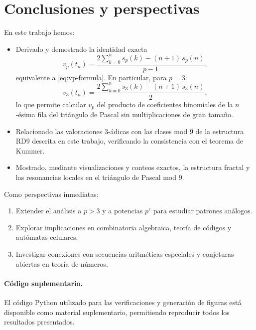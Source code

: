 \documentclass[12pt]{article}
\begin{document}
\section*{Conclusiones y perspectivas}

En este trabajo hemos:
\begin{itemize}
  \item Derivado y demostrado la identidad exacta
  \[
    v_p(t_n) = \frac{2\sum_{k=0}^{n} s_p(k) - (n+1)\, s_p(n)}{p-1},
  \]
  equivalente a \eqref{eq:vp-formula}. En particular, para $p=3$:
  \[
    v_3(t_n) = \frac{2\sum_{k=0}^{n} s_3(k) - (n+1)\, s_3(n)}{2},
  \]
  lo que permite calcular $v_p$ del producto de coeficientes binomiales de la $n$-ésima fila
  del triángulo de Pascal sin multiplicaciones de gran tamaño.

\item Relacionado las valoraciones $3$-ádicas con las clases mod $9$ de la estructura RD9 descrita en este trabajo, verificando la consistencia con el teorema de Kummer.


  \item Mostrado, mediante visualizaciones y conteos exactos, la estructura fractal y las resonancias locales en el triángulo de Pascal mod $9$.
\end{itemize}

\noindent
Como perspectivas inmediatas:
\begin{enumerate}
  \item Extender el análisis a $p>3$ y a potencias $p^r$ para estudiar patrones análogos.
  \item Explorar implicaciones en combinatoria algebraica, teoría de códigos y autómatas celulares.
  \item Investigar conexiones con secuencias aritméticas especiales y conjeturas abiertas en teoría de números.
\end{enumerate}

\paragraph{Código suplementario.}
El código Python utilizado para las verificaciones y generación de figuras está disponible como material suplementario, permitiendo reproducir todos los resultados presentados.
\end{document}
